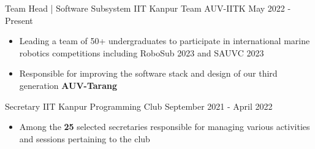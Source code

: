 \cventry
{Team Head | Software Subsystem} %
{IIT Kanpur} %
{Team AUV-IITK} %
{May 2022 - Present} %
{
  \begin{itemize} %
    \item Leading a team of 50+ undergraduates to participate in international marine robotics competitions including RoboSub 2023 and SAUVC 2023
    \item Responsible for improving the software stack and design of our third generation \textbf{AUV-Tarang}
  \end{itemize}
}

\cventry
{Secretary} %
{IIT Kanpur} %
{Programming Club} %
{September 2021 - April 2022} %
{

  \begin{itemize} %
    \item Among the \textbf{25} selected secretaries responsible for managing various activities and sessions pertaining to the club
  \end{itemize}
}
